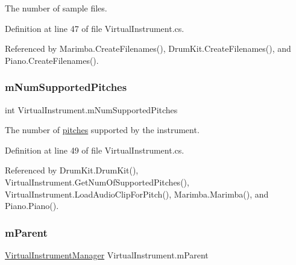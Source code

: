 The number of sample files. 



Definition at line 47 of file Virtual\+Instrument.\+cs.



Referenced by Marimba.\+Create\+Filenames(), Drum\+Kit.\+Create\+Filenames(), and Piano.\+Create\+Filenames().

\mbox{\label{group___v_i_base_pro_var_gafc759a16324cf9b3f230bcbf040afcd2}} 
\subsubsection{\texorpdfstring{m\+Num\+Supported\+Pitches}{mNumSupportedPitches}}
{\footnotesize\ttfamily int Virtual\+Instrument.\+m\+Num\+Supported\+Pitches\hspace{0.3cm}{\ttfamily [protected]}}



The number of \hyperlink{group___music_enums_ga508f69b199ea518f935486c990edac1d}{pitches} supported by the instrument. 



Definition at line 49 of file Virtual\+Instrument.\+cs.



Referenced by Drum\+Kit.\+Drum\+Kit(), Virtual\+Instrument.\+Get\+Num\+Of\+Supported\+Pitches(), Virtual\+Instrument.\+Load\+Audio\+Clip\+For\+Pitch(), Marimba.\+Marimba(), and Piano.\+Piano().

\mbox{\label{group___v_i_base_pro_var_gae4a87a656d9448cfea28215a6b9c3840}} 
\subsubsection{\texorpdfstring{m\+Parent}{mParent}}
{\footnotesize\ttfamily \hyperlink{class_virtual_instrument_manager}{Virtual\+Instrument\+Manager} Virtual\+Instrument.\+m\+Parent\hspace{0.3cm}{\ttfamily [protected]}}



